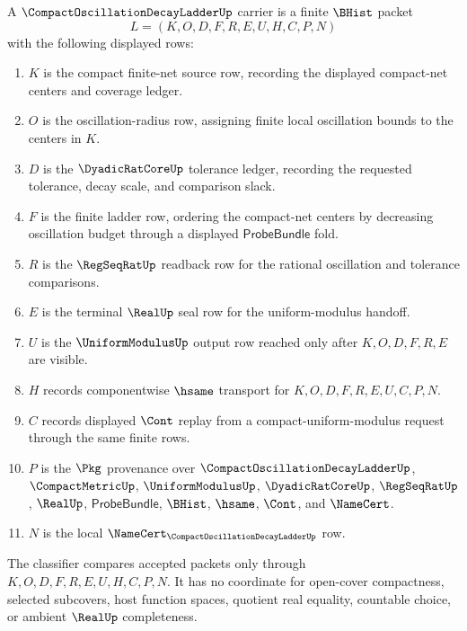 \begin{definition}
\label{def:compact-oscillation-decay-ladder-carrier}
A $\CompactOscillationDecayLadderUp$ carrier is a finite $\BHist$ packet
$$
L=(K,O,D,F,R,E,U,H,C,P,N)
$$
with the following displayed rows:
\begin{enumerate}
\item $K$ is the compact finite-net source row, recording the displayed compact-net centers and coverage ledger.
\item $O$ is the oscillation-radius row, assigning finite local oscillation bounds to the centers in $K$.
\item $D$ is the $\DyadicRatCoreUp$ tolerance ledger, recording the requested tolerance, decay scale, and comparison slack.
\item $F$ is the finite ladder row, ordering the compact-net centers by decreasing oscillation budget through a displayed $\mathsf{ProbeBundle}$ fold.
\item $R$ is the $\RegSeqRatUp$ readback row for the rational oscillation and tolerance comparisons.
\item $E$ is the terminal $\RealUp$ seal row for the uniform-modulus handoff.
\item $U$ is the $\UniformModulusUp$ output row reached only after $K,O,D,F,R,E$ are visible.
\item $H$ records componentwise $\hsame$ transport for $K,O,D,F,R,E,U,C,P,N$.
\item $C$ records displayed $\Cont$ replay from a compact-uniform-modulus request through the same finite rows.
\item $P$ is the $\Pkg$ provenance over $\CompactOscillationDecayLadderUp$, $\CompactMetricUp$, $\UniformModulusUp$, $\DyadicRatCoreUp$, $\RegSeqRatUp$, $\RealUp$, $\mathsf{ProbeBundle}$, $\BHist$, $\hsame$, $\Cont$, and $\NameCert$.
\item $N$ is the local $\NameCert_{\CompactOscillationDecayLadderUp}$ row.
\end{enumerate}
The classifier compares accepted packets only through $K,O,D,F,R,E,U,H,C,P,N$. It has no coordinate for open-cover compactness, selected subcovers, host function spaces, quotient real equality, countable choice, or ambient $\RealUp$ completeness.
\end{definition}

